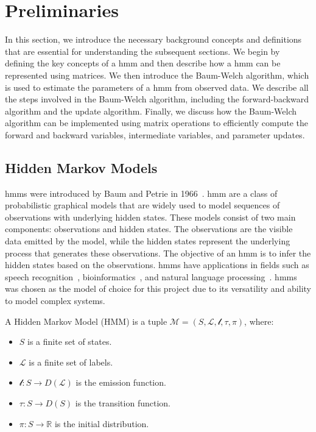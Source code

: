 \section{Preliminaries}\label{sec:preliminaries}
In this section, we introduce the necessary background concepts and definitions that are essential for understanding the subsequent sections.
We begin by defining the key concepts of a \gls{hmm} and then describe how a \gls{hmm} can be represented using matrices.
We then introduce the Baum-Welch algorithm, which is used to estimate the parameters of a \gls{hmm} from observed data.
We describe all the steps involved in the Baum-Welch algorithm, including the forward-backward algorithm and the update algorithm.
Finally, we discuss how the Baum-Welch algorithm can be implemented using matrix operations to efficiently compute the forward and backward variables, intermediate variables, and parameter updates.

\subsection{Hidden Markov Models}\label{subsec:hmm}
\glspl{hmm} were introduced by Baum and Petrie in 1966~\cite{baum1966statistical}.
\gls{hmm} are a class of probabilistic graphical models that are widely used to model sequences of observations with underlying hidden states.
These models consist of two main components: observations and hidden states.
The observations are the visible data emitted by the model, while the hidden states represent the underlying process that generates these observations.
The objective of an \gls{hmm} is to infer the hidden states based on the observations.
\glspl{hmm} have applications in fields such as speech recognition~\cite{chavan2013overview}, bioinformatics~\cite{de2007hidden}, and natural language processing~\cite{murveit1990integrating}.
\glspl{hmm} was chosen as the model of choice for this project due to its versatility and ability to model complex systems.

\begin{definition}
    A Hidden Markov Model (HMM) is a tuple $\mathcal{M} = (S, \mathcal{L}, \mathscr{l}, \tau,  \pi)$, where:
    \begin{itemize}
        \item $S$ is a finite set of states.
        \item $\mathcal{L}$ is a finite set of labels.
        \item $\mathscr{l}: S \rightarrow D(\mathcal{L})$ is the emission function.
        \item $\tau: S \rightarrow D(S)$ is the transition function.
        \item $\pi: S \rightarrow \mathbb{R}$ is the initial distribution.
    \end{itemize}
\end{definition}

